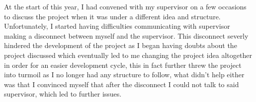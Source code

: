 At the start of this year, I had convened with my supervisor on a few occasions to discuss the project when it was under a different idea and structure. Unfortunately, I started having difficulties communicating with supervisor making a disconnect between myself and the supervisor. This disconnect severly hindered the development of the project as I began having doubts about the project discussed which eventually led to me changing the project idea altogether in order for an easier development cycle, this in fact further threw the project into turmoil as I no longer had any structure to follow, what didn't help either was that I convinced myself that after the disconnect I could not talk to said supervisor, which led to further issues.



